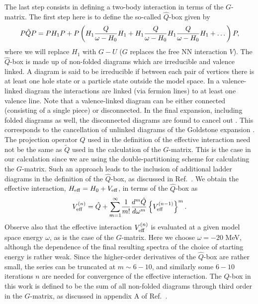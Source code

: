The last step consists in defining a
two-body interaction in terms of the $G$-matrix.
The first step here is to define the so-called $\hat{Q}$-box given by
\begin{equation}
   P\hat{Q}P=PH_1P+
   P\left(H_1 \frac{Q}{\omega-H_{0}}H_1\\ +H_1
   \frac{Q}{\omega-H_{0}}H_1 \frac{Q}{\omega-H_{0}}H_1 +\dots\right)P,
   \label{eq:qbox}
\end{equation}
where we will replace $H_1$ with $G-U$ ($G$ replaces the free NN interaction
$V$).
The $\hat{Q}$-box is made up of non-folded diagrams which are irreducible
and valence linked.
A diagram is said to be irreducible if between each pair
of vertices there is at least one hole state or a particle state outside
the model space. In a valence-linked diagram the interactions are linked
(via fermion lines) to at least one valence line. Note that a valence-linked
diagram can be either connected (consisting of a single piece) or
disconnected. In the final expansion, including folded diagrams as well, the
disconnected diagrams are found to cancel out \cite{ko90}.
This corresponds to the cancellation of unlinked diagrams
of the Goldstone expansion \cite{ko90}.
The projection operator $Q$ used in the definition 
of the effective interaction need not be the same as $\tilde{Q}$
 used in 
the calculation of the $G$-matrix. This is the case in our calculation
since we are using the double-partitioning scheme for calculating the
$G$-matrix. Such an approach leads to the inclusion of additional
ladder diagrams in the definition of the $\hat{Q}$-box, as discussed in
Ref.\ \cite{hko95}.
We obtain the effective interaction,
$H_{\rm{eff}}=H_0+V_{\rm{eff}}$, in terms of the $\hat{Q}$-box as
\cite{hko95,ko90}
\begin{equation}
    V_{\rm{eff}}^{(n)}=\hat{Q}+{\displaystyle\sum_{m=1}^{\infty}}
    \frac{1}{m!}\frac{d^m\hat{Q}}{d\omega^m}\left\{
    V_{\rm{eff}}^{(n-1)}\right\}^m.
    \label{eq:fd}
\end{equation}
Observe also that the
effective interaction $V_{\rm{eff}}^{(n)}$
is evaluated at a given model space energy
$\omega$, as is the case of the $G$-matrix. Here we choose
$\omega =-20$ MeV, although the dependence
of the final resulting spectra of the choice
of starting energy is rather weak. Since the higher-order derivatives of the 
$\hat{Q}$-box are rather small, the series can be truncated 
at $m\sim 6-10$, and similarly some $6-10$ iterations $n$ are 
needed for convergence of the effective interaction. 
The $\hat{Q}$-box in this work is defined to be the sum
of all non-folded diagrams through third order in the $G$-matrix, as
discussed in appendix A of Ref.\ \cite{hko95}.


